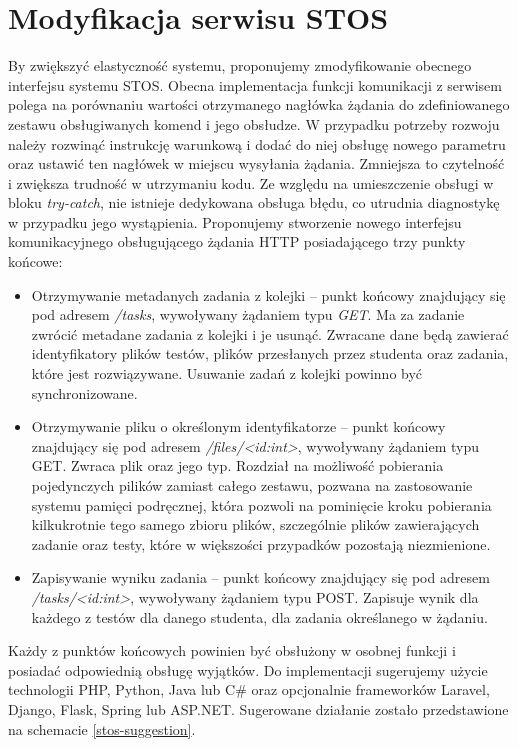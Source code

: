 \section{Modyfikacja serwisu STOS}
By zwiększyć elastyczność systemu, proponujemy zmodyfikowanie obecnego interfejsu systemu STOS. Obecna implementacja funkcji komunikacji z serwisem polega na porównaniu wartości otrzymanego nagłówka żądania do zdefiniowanego zestawu obsługiwanych komend i jego obsłudze. W przypadku potrzeby rozwoju należy rozwinąć instrukcję warunkową i dodać do niej obsługę nowego parametru oraz ustawić ten nagłówek w miejscu wysyłania żądania. Zmniejsza to czytelność i zwiększa trudność w utrzymaniu kodu. Ze względu na umieszczenie obsługi w bloku \textit{try-catch}, nie istnieje dedykowana obsługa błędu, co utrudnia diagnostykę w przypadku jego wystąpienia. Proponujemy stworzenie nowego interfejsu komunikacyjnego obsługującego żądania HTTP posiadającego trzy punkty końcowe:
\begin{itemize}
    \item Otrzymywanie metadanych zadania z kolejki -- punkt końcowy znajdujący się pod adresem \textit{/tasks}, wywoływany żądaniem typu \textit{GET}. Ma za zadanie zwrócić metadane zadania z kolejki i je usunąć. Zwracane dane będą zawierać identyfikatory plików testów, plików przesłanych przez studenta oraz zadania, które jest rozwiązywane. Usuwanie zadań z kolejki powinno być synchronizowane.
    \item Otrzymywanie pliku o określonym identyfikatorze -- punkt końcowy znajdujący się pod adresem \textit{/files/<id:int>}, wywoływany żądaniem typu GET. Zwraca plik oraz jego typ. Rozdział na możliwość pobierania pojedynczych pilików zamiast całego zestawu, pozwana na zastosowanie systemu pamięci podręcznej, która pozwoli na pominięcie kroku pobierania kilkukrotnie tego samego zbioru plików, szczególnie plików zawierających zadanie oraz testy, które w większości przypadków pozostają niezmienione.
    \item Zapisywanie wyniku zadania -- punkt końcowy znajdujący się pod adresem \textit{/tasks/<id:int>}, wywoływany żądaniem typu POST. Zapisuje wynik dla każdego z testów dla danego studenta, dla zadania określanego w żądaniu.
\end{itemize}
\newline \indent Każdy z punktów końcowych powinien być obsłużony w osobnej funkcji i posiadać odpowiednią obsługę wyjątków. Do implementacji sugerujemy użycie technologii PHP, Python, Java lub C# oraz opcjonalnie frameworków Laravel, Django, Flask, Spring lub ASP.NET. Sugerowane działanie zostało przedstawione na schemacie \ref{stos-suggestion}.
